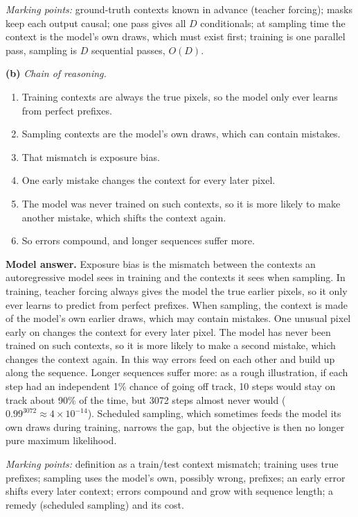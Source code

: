 \documentclass[12pt,a4paper]{article}
\begin{document}
\emph{Marking points:} ground-truth contexts known in advance (teacher forcing); masks keep each output causal; one pass gives all $D$ conditionals; at sampling time the context is the model's own draws, which must exist first; training is one parallel pass, sampling is $D$ sequential passes, $O(D)$.

\textbf{(b)} \emph{Chain of reasoning.}
\begin{enumerate}[nosep]
  \item Training contexts are always the true pixels, so the model only ever learns from perfect prefixes.
  \item Sampling contexts are the model's own draws, which can contain mistakes.
  \item That mismatch is exposure bias.
  \item One early mistake changes the context for every later pixel.
  \item The model was never trained on such contexts, so it is more likely to make another mistake, which shifts the context again.
  \item So errors compound, and longer sequences suffer more.
\end{enumerate}

\textbf{Model answer.} Exposure bias is the mismatch between the contexts an autoregressive model sees in training and the contexts it sees when sampling. In training, teacher forcing always gives the model the true earlier pixels, so it only ever learns to predict from perfect prefixes. When sampling, the context is made of the model's own earlier draws, which may contain mistakes. One unusual pixel early on changes the context for every later pixel. The model has never been trained on such contexts, so it is more likely to make a second mistake, which changes the context again. In this way errors feed on each other and build up along the sequence. Longer sequences suffer more: as a rough illustration, if each step had an independent 1\% chance of going off track, 10 steps would stay on track about 90\% of the time, but 3072 steps almost never would ($0.99^{3072}\approx4\times10^{-14}$). Scheduled sampling, which sometimes feeds the model its own draws during training, narrows the gap, but the objective is then no longer pure maximum likelihood.

\emph{Marking points:} definition as a train/test context mismatch; training uses true prefixes; sampling uses the model's own, possibly wrong, prefixes; an early error shifts every later context; errors compound and grow with sequence length; a remedy (scheduled sampling) and its cost.
\end{document}
